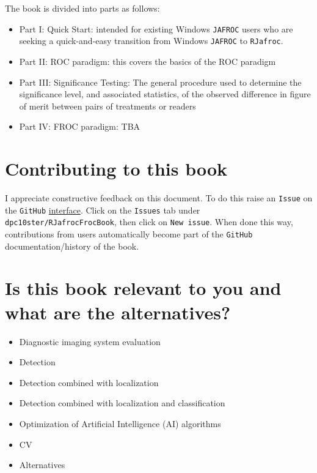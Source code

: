 \documentclass[
]{book}
\providecommand{\tightlist}{%
  \setlength{\itemsep}{0pt}\setlength{\parskip}{0pt}}
\begin{document}
The book is divided into parts as follows:

\begin{itemize}
\tightlist
\item
  Part I: Quick Start: intended for existing Windows \texttt{JAFROC} users who are seeking a quick-and-easy transition from Windows \texttt{JAFROC} to \texttt{RJafroc}.
\item
  Part II: ROC paradigm: this covers the basics of the ROC paradigm
\item
  Part III: Significance Testing: The general procedure used to determine the significance level, and associated statistics, of the observed difference in figure of merit between pairs of treatments or readers
\item
  Part IV: FROC paradigm: TBA
\end{itemize}

\hypertarget{contributing-to-this-book}{%
\section*{Contributing to this book}\label{contributing-to-this-book}}

I appreciate constructive feedback on this document. To do this raise an \texttt{Issue} on the \texttt{GitHub} \href{https://github.com/dpc10ster/RJafrocFrocBook}{interface}. Click on the \texttt{Issues} tab under \texttt{dpc10ster/RJafrocFrocBook}, then click on \texttt{New\ issue}. When done this way, contributions from users automatically become part of the \texttt{GitHub} documentation/history of the book.

\hypertarget{is-this-book-relevant-to-you-and-what-are-the-alternatives}{%
\section*{Is this book relevant to you and what are the alternatives?}\label{is-this-book-relevant-to-you-and-what-are-the-alternatives}}

\begin{itemize}
\tightlist
\item
  Diagnostic imaging system evaluation
\item
  Detection
\item
  Detection combined with localization
\item
  Detection combined with localization and classification
\item
  Optimization of Artificial Intelligence (AI) algorithms
\item
  CV
\item
  Alternatives
\end{itemize}
\end{document}
